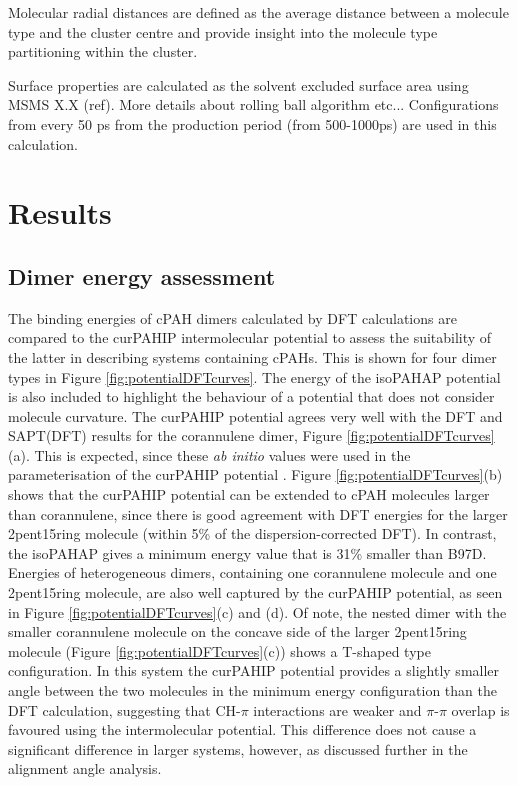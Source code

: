 Molecular radial distances are defined as the average distance between a molecule type and the cluster centre and provide insight into the molecule type partitioning within the cluster.

Surface properties are calculated as the solvent excluded surface area using MSMS X.X (ref). More details about rolling ball algorithm etc...
Configurations from every 50 ps from the production period (from 500-1000ps) are used in this calculation.


\section{Results}
\subsection{Dimer energy assessment} %
The binding energies of cPAH dimers calculated by DFT calculations are compared to the curPAHIP intermolecular potential to assess the suitability of the latter in describing systems containing cPAHs.  This is shown for four dimer types in Figure \ref{fig:potentialDFTcurves}.  The energy of the isoPAHAP potential is also included to highlight the behaviour of a potential that does not consider molecule curvature.
The curPAHIP potential agrees very well with the DFT and SAPT(DFT) results for the corannulene dimer, Figure \ref{fig:potentialDFTcurves}(a). This is expected, since these \textit{ab initio} values were used in the parameterisation of the curPAHIP potential \cite{bowal2019ion}. 
Figure \ref{fig:potentialDFTcurves}(b) shows that the curPAHIP potential can be extended to cPAH molecules larger than corannulene, since there is good agreement with DFT energies for the larger 2pent15ring molecule (within 5\% of the dispersion-corrected DFT). In contrast, the isoPAHAP gives a minimum energy value that is 31\% smaller than B97D.
Energies of heterogeneous dimers, containing one corannulene molecule and one 2pent15ring molecule, are also well captured by the curPAHIP potential, as seen in Figure \ref{fig:potentialDFTcurves}(c) and (d).  Of note, the nested dimer with the smaller corannulene molecule on the concave side of the larger 2pent15ring molecule (Figure \ref{fig:potentialDFTcurves}(c)) shows a T-shaped type configuration. In this system the curPAHIP potential provides a slightly smaller %
angle between the two molecules in the minimum energy configuration than the DFT calculation, suggesting that CH-$\pi$ interactions are weaker and $\pi$-$\pi$ overlap is favoured using the intermolecular potential.  This difference does not cause a significant difference in larger systems, however, as discussed further in the alignment angle analysis. %
